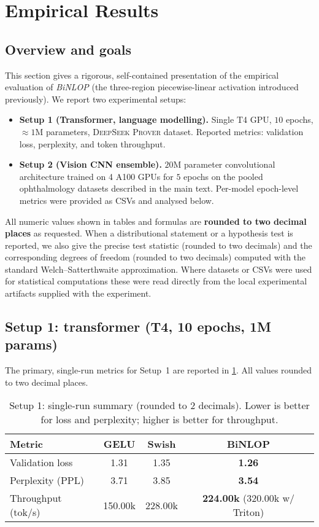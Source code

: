 \documentclass[11pt, twoside, openright, english]{article}
\numberwithin{equation}{section}
\theoremstyle{plain}
\theoremstyle{definition}
\theoremstyle{remark}
\begin{document}
\section{Empirical Results}
\label{sec:empirical}

\subsection{Overview and goals}
This section gives a rigorous, self-contained presentation of the empirical evaluation of \emph{BiNLOP} (the three-region piecewise-linear activation introduced previously). We report two experimental setups:

\begin{itemize}
  \item \textbf{Setup 1 (Transformer, language modelling).} Single T4 GPU, $10$ epochs, $\approx 1\text{M}$ parameters, \textsc{DeepSeek Prover} dataset. Reported metrics: validation loss, perplexity, and token throughput.
  \item \textbf{Setup 2 (Vision CNN ensemble).} $20\text{M}$ parameter convolutional architecture trained on 4 A100 GPUs for $5$ epochs on the pooled ophthalmology datasets described in the main text. Per-model epoch-level metrics were provided as CSVs and analysed below.
\end{itemize}

All numeric values shown in tables and formulas are \textbf{rounded to two decimal places} as requested. When a distributional statement or a hypothesis test is reported, we also give the precise test statistic (rounded to two decimals) and the corresponding degrees of freedom (rounded to two decimals) computed with the standard Welch--Satterthwaite approximation. Where datasets or CSVs were used for statistical computations these were read directly from the local experimental artifacts supplied with the experiment.

\subsection{Setup 1: transformer (T4, 10 epochs, 1M params)}
The primary, single-run metrics for Setup~1 are reported in \cref{tab:setup1-results}.  All values rounded to two decimal places.

\begin{table}[H]
\centering
\caption{Setup 1: single-run summary (rounded to 2 decimals). Lower is better for loss and perplexity; higher is better for throughput.}
\label{tab:setup1-results}
\begin{tabular}{lccc}
\toprule
Metric & GELU & Swish & \textbf{BiNLOP} \\
\midrule
Validation loss & 1.31 & 1.35 & \textbf{1.26} \\
Perplexity (PPL) & 3.71 & 3.85 & \textbf{3.54} \\
Throughput (tok/s) & 150.00k & 228.00k & \textbf{224.00k} (320.00k w/ Triton) \\
\bottomrule
\end{tabular}
\end{table}
\end{document}
